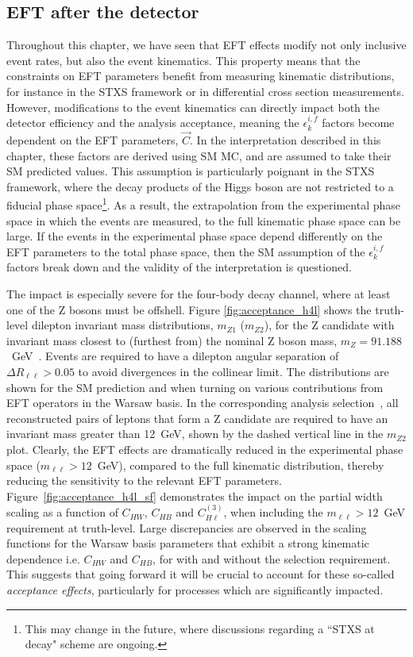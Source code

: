 \subsection{EFT after the detector}\label{sec:eft_acceptance_corrections}
Throughout this chapter, we have seen that EFT effects modify not only inclusive event rates, but also the event kinematics. This property means that the constraints on EFT parameters benefit from measuring kinematic distributions, for instance in the STXS framework or in differential cross section measurements. However, modifications to the event kinematics can directly impact both the detector efficiency and the analysis acceptance, meaning the $\epsilon^{i,f}_k$ factors become dependent on the EFT parameters, $\vec{C}$. In the interpretation described in this chapter, these factors are derived using SM MC, and are assumed to take their SM predicted values. This assumption is particularly poignant in the STXS framework, where the decay products of the Higgs boson are not restricted to a fiducial phase space\footnote{This may change in the future, where discussions regarding a ``STXS at decay" scheme are ongoing.}. As a result, the extrapolation from the experimental phase space in which the events are measured, to the full kinematic phase space can be large. If the events in the experimental phase space depend differently on the EFT parameters to the total phase space, then the SM assumption of the $\epsilon^{i,f}_k$ factors break down and the validity of the interpretation is questioned. 

The impact is especially severe for the four-body \Hfl decay channel, where at least one of the Z bosons must be offshell. Figure \ref{fig:acceptance_h4l} shows the truth-level dilepton invariant mass distributions, $m_{Z1}$ ($m_{Z2}$), for the Z candidate with invariant mass closest to (furthest from) the nominal Z boson mass, $m_Z=91.188$~GeV~\cite{Zyla:2020zbs}. Events are required to have a dilepton angular separation of $\Delta R_{\ell\ell} > 0.05$ to avoid divergences in the collinear limit. The distributions are shown for the SM prediction and when turning on various contributions from EFT operators in the Warsaw basis. In the corresponding analysis selection~\cite{}, all reconstructed pairs of leptons that form a Z candidate are required to have an invariant mass greater than 12~GeV, shown by the dashed vertical line in the $m_{Z2}$ plot. Clearly, the EFT effects are dramatically reduced in the experimental phase space ($m_{\ell\ell}>12$~GeV), compared to the full kinematic distribution, thereby reducing the sensitivity to the relevant EFT parameters. Figure~\ref{fig:acceptance_h4l_sf} demonstrates the impact on the \HZZ partial width scaling as a function of $C_{HW}$, $C_{HB}$ and $C^{(3)}_{H\ell}$, when including the $m_{\ell\ell}>12$~GeV requirement at truth-level. Large discrepancies are observed in the scaling functions for the Warsaw basis parameters that exhibit
a strong kinematic dependence i.e. $C_{HW}$ and $C_{HB}$, for with and without the selection requirement. This suggests that going forward it will be crucial to account for these so-called \textit{acceptance effects}, particularly for processes which are significantly impacted.

